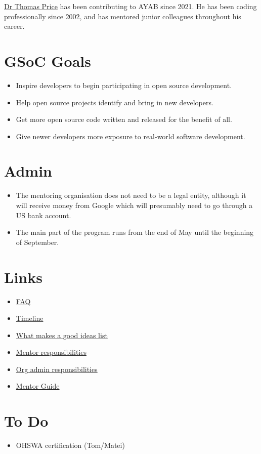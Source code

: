 \documentclass{article}
\begin{document}
\href{https://t0mpr1c3.github.io/}{Dr Thomas Price} has been contributing to AYAB since 2021. He has been coding professionally since 2002, and has mentored junior colleagues throughout his career.


\section{GSoC Goals}

{\itshape
\begin{itemize}
\item Inspire developers to begin participating in open source development.
\item Help open source projects identify and bring in new developers.
\item Get more open source code written and released for the benefit of all.
\item Give newer developers more exposure to real-world software development.
\end{itemize}
}


\section{Admin}

{\itshape 
\begin{itemize}
\item The mentoring organisation does not need to be a legal entity, although it will receive money from Google which will presumably need to go through a US bank account.
\item The main part of the program runs from the end of May until the beginning of September.
\end{itemize}
}


\section{Links}

\begin{itemize}\item \href{https://developers.google.com/open-source/gsoc/faq}{FAQ}
\item \href{https://developers.google.com/open-source/gsoc/timeline}{Timeline}
\item \href{https://google.github.io/gsocguides/mentor/defining-a-project-ideas-list.html}{What makes a good ideas list}
\item \href{https://developers.google.com/open-source/gsoc/help/responsibilities#mentor_responsibilities}{Mentor responsibilities}
\item \href{https://developers.google.com/open-source/gsoc/help/responsibilities#org_admin_responsibilities}{Org admin responsibilities}
\item \href{https://google.github.io/gsocguides/mentor/}{Mentor Guide}
\end{itemize}


\section{To Do}

{\itshape 
\begin{itemize}
\item OHSWA certification (Tom/Matei)
\end{itemize}
}
\end{document}
